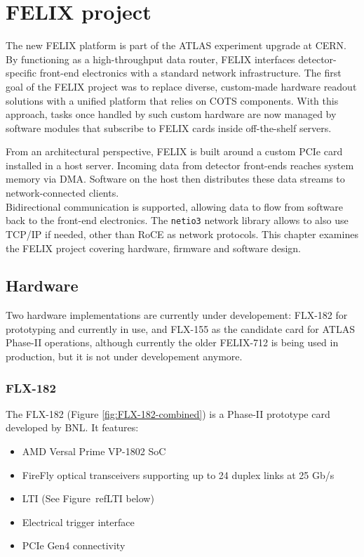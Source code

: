 \chapter{\acs{FELIX} project}

The new \acs{FELIX} platform is part of the \acs{ATLAS} experiment upgrade at \ac{CERN}. By functioning as a high-throughput data router, \acs{FELIX} interfaces detector-specific front-end electronics with a standard network infrastructure. The first goal of the \acs{FELIX} project was to replace diverse, custom-made hardware readout solutions with a unified platform that relies on \acf{COTS} components. With this approach, tasks once handled by such custom hardware are now managed by software modules that subscribe to \acs{FELIX} cards inside off-the-shelf servers.

From an architectural perspective, \acs{FELIX} is built around a custom \acs{PCIe} card installed in a host server. Incoming data from detector front-ends reaches system memory via \acf{DMA}. Software on the host then distributes these data streams to network-connected clients.\\
Bidirectional communication is supported, allowing data to flow from software back to the front-end electronics. The \texttt{netio3} network library allows to also use TCP/IP if needed, other than \acf{RoCE} as network protocols. This chapter examines the \acs{FELIX} project covering hardware, firmware and software design.

\clearpage
\section{Hardware}

Two hardware implementations are currently under developement: FLX-182 for prototyping and currently in use, and FLX-155 as the candidate card for \acs{ATLAS} Phase-II operations, although currently the older FELIX-712 is  being used in production, but it is not under developement anymore.

\subsection{FLX-182}

The FLX-182 \cite{Ilic:2873569} (Figure \ref{fig:FLX-182-combined}) is a Phase-II prototype card developed by \acf{BNL}. It features:

\begin{itemize}
    \item AMD Versal Prime VP-1802 \acf{SoC}
    \item FireFly optical transceivers supporting up to 24 duplex links at 25 Gb/s \cite{firefly-optical-transceiver}
    \item \acf{LTI} (See Figure~ref{LTI} below)
    \item Electrical trigger interface
    \item \acs{PCIe} Gen4 connectivity
\end{itemize}

